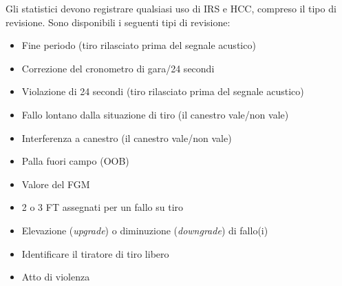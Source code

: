 Gli statistici devono registrare qualsiasi uso di IRS e HCC, compreso il tipo di revisione. Sono disponibili i seguenti tipi di revisione:

\begin{itemize}
    \item Fine periodo (tiro rilasciato prima del segnale acustico)
    \item Correzione del cronometro di gara/24 secondi
    \item Violazione di 24 secondi (tiro rilasciato prima del segnale acustico)
    \item Fallo lontano dalla situazione di tiro (il canestro vale/non vale)
    \item Interferenza a canestro (il canestro vale/non vale)
    \item Palla fuori campo (OOB)
    \item Valore del FGM
    \item 2 o 3 FT assegnati per un fallo su tiro
    \item Elevazione (\textit{upgrade}) o diminuzione (\textit{downgrade}) di fallo(i)
    \item Identificare il tiratore di tiro libero
    \item Atto di violenza
\end{itemize}